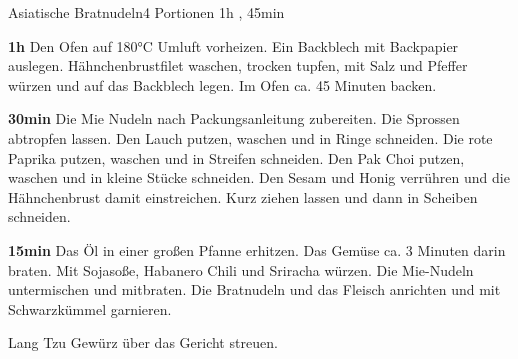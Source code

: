 \documentclass[../recipe-collections/cooking.tex]{subfiles}
\begin{document}
\begin{recipe}{Asiatische Bratnudeln}{4 Portionen }{1h , 45min }

  \freeform{}\textit{}


  \textbf{1h}
  Den Ofen auf 180°C Umluft vorheizen.
  Ein Backblech mit Backpapier auslegen.
  Hähnchenbrustfilet waschen, trocken tupfen, mit Salz und Pfeffer würzen und auf das Backblech legen.
  Im Ofen ca. 45 Minuten backen.


  \textbf{30min}
  Die Mie Nudeln nach Packungsanleitung zubereiten.
  Die Sprossen abtropfen lassen.
  Den Lauch putzen, waschen und in Ringe schneiden.
  Die rote Paprika putzen, waschen und in Streifen schneiden.
  Den Pak Choi putzen, waschen und in kleine Stücke schneiden.
  Den Sesam und Honig verrühren und die Hähnchenbrust damit einstreichen.
  Kurz ziehen lassen und dann in Scheiben schneiden.


  \textbf{15min}
  Das Öl in einer großen Pfanne erhitzen.
  Das Gemüse ca. 3 Minuten darin braten.
  Mit Sojasoße, Habanero Chili und Sriracha würzen.
  Die Mie-Nudeln untermischen und mitbraten.
  Die Bratnudeln und das Fleisch anrichten und mit Schwarzkümmel garnieren.

  \freeform{}\hrulefill{}

  \freeform{}
  Lang Tzu Gewürz über das Gericht streuen.

\end{recipe}
\end{document}
